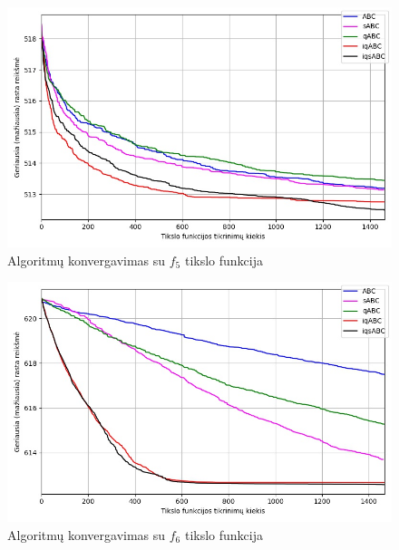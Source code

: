 \documentclass{VUMIFPSmagistrinis}
\begin{document}
\begin{landscape}
\begin{multicols}{2}
\begin{figure}[H]
    \centering
    \includegraphics[scale=0.45]{img/2kv/all_f5.jpg}
    \caption{Algoritmų konvergavimas su $f_{5}$ tikslo funkcija}
    \label{img:konf5}
\end{figure}

\begin{figure}[H]
    \centering
    \includegraphics[scale=0.45]{img/2kv/all_f6.jpg}
    \caption{Algoritmų konvergavimas su $f_{6}$ tikslo funkcija}
    \label{img:konf6}
\end{figure}





\end{multicols}\newpage
\begin{multicols}{2}


\end{multicols}
\end{landscape}
\end{document}
